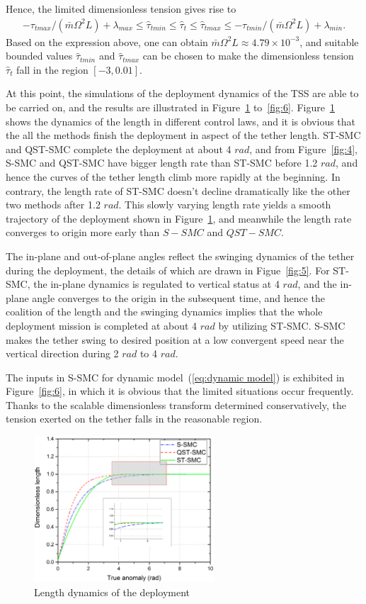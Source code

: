 \documentclass[Journal,letterpaper]{ascelike-new}
\theoremstyle{plain}
\theoremstyle{remark}
\begin{document}
Hence, the limited dimensionless tension gives rise to
\begin{align}
-\tau_{tmax}/(\bar{m}\Omega^2L)+\lambda_{max}\le\hat\tau_{tmin}\le\hat\tau_t\le\hat\tau_{tmax}\le-\tau_{tmin}/(\bar{m}\Omega^2L)+\lambda_{min}.
\end{align}
Based on the expression above, one can obtain $\bar{m}\Omega^2L\approx 4.79\times 10^{-3}$, and suitable bounded values $\hat\tau_{tmin}$ and $\hat\tau_{tmax}$ can be chosen to make the dimensionless tension $\hat\tau_t$ fall in the region $[-3,0.01]$.\par
At this point, the simulations of the deployment dynamics of the TSS are able to be carried on, and the results are illustrated in Figure~\ref{fig:3} to~\ref{fig:6}. Figure~\ref{fig:3} shows the dynamics of the length in different control laws, and it is obvious that the all the methods finish the deployment in aspect of the tether length. ST-SMC and QST-SMC complete the deployment at about 4 $rad$, and from Figure~\ref{fig:4}, S-SMC and QST-SMC have bigger length rate than ST-SMC before 1.2 $rad$, and hence the curves of the tether length climb more rapidly at the beginning. In contrary, the length rate of ST-SMC doesn't decline dramatically like the other two methods after 1.2 $rad$. This slowly varying length rate yields a smooth trajectory of the deployment shown in Figure~\ref{fig:3}, and meanwhile the length rate converges to origin more early than $S-SMC$ and $QST-SMC$.\par
The in-plane and out-of-plane angles reflect the swinging dynamics of the tether during the deployment, the details of which are drawn in Figue~\ref{fig:5}. For ST-SMC, the in-plane dynamics is regulated to vertical status at 4 $rad$, and the in-plane angle converges to the origin in the subsequent time, and hence the coalition of the length and the swinging dynamics implies that the whole deployment mission is completed at about 4 $rad$ by utilizing ST-SMC. S-SMC makes the tether swing to desired position at a low convergent speed near the vertical direction during 2 $rad$ to 4 $rad$.\par
The inputs in S-SMC for dynamic model~(\ref{eq:dynamic model}) is exhibited in Figure~\ref{fig:6}, in which it is obvious that the limited situations occur frequently. Thanks to the scalable dimensionless transform determined conservatively, the tension exerted on the tether falls in the reasonable region.
\begin{figure}
\centering
\includegraphics[width=0.6\textwidth]{paper4_fig3.eps}
\caption{Length dynamics of the deployment}
\label{fig:3}
\end{figure}
\end{document}
